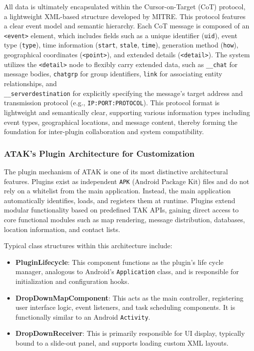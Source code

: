 All data is ultimately encapsulated within the Cursor-on-Target (CoT) protocol, a lightweight XML-based structure developed by MITRE. This protocol features a clear event model and semantic hierarchy. Each CoT message is composed of an \texttt{<event>} element, which includes fields such as a unique identifier (\texttt{uid}), event type (\texttt{type}), time information (\texttt{start}, \texttt{stale}, \texttt{time}), generation method (\texttt{how}), geographical coordinates (\texttt{<point>}), and extended details (\texttt{<detail>}). The system utilizes the \texttt{\textless detail\textgreater} node to flexibly carry extended data, such as \texttt{\_\_chat} for message bodies, \texttt{chatgrp} for group identifiers, \texttt{link} for associating entity relationships,  and \\\texttt{\_\_serverdestination} for explicitly specifying the message's target address and transmission protocol (e.g., \texttt{IP:PORT:PROTOCOL}). This protocol format is lightweight and semantically clear, supporting various information types including event types, geographical locations, and message content, thereby forming the foundation for inter-plugin collaboration and system compatibility.

\subsubsection{ATAK's Plugin Architecture for Customization}
The plugin mechanism of ATAK is one of its most distinctive architectural features. Plugins exist as independent \texttt{APK} (Android Package Kit) files and do not rely on a whitelist from the main application. Instead, the main application automatically identifies, loads, and registers them at runtime. Plugins extend modular functionality based on predefined TAK APIs, gaining direct access to core functional modules such as map rendering, message distribution, databases, location information, and contact lists.

Typical class structures within this architecture include:

\begin{itemize}
  \item \textbf{PluginLifecycle}: This component functions as the plugin's life cycle manager, analogous to Android's \texttt{Application} class, and is responsible for initialization and configuration hooks.

  \item \textbf{DropDownMapComponent}: This acts as the main controller, registering user interface logic, event listeners, and task scheduling components. It is functionally similar to an Android \texttt{Activity}.

  \item \textbf{DropDownReceiver}: This is primarily responsible for UI display, typically bound to a slide-out panel, and supports loading custom XML layouts.
\end{itemize}

